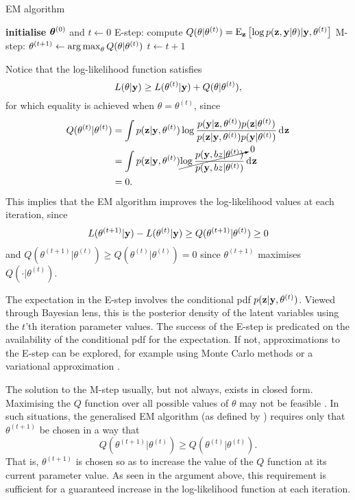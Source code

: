 \begin{algorithm}[H]
\caption{EM algorithm}\label{alg:EM4}
\begin{algorithmic}[1]
  \State \textbf{initialise} ${\bm\theta}^{(0)}$ and $t\gets 0$
    \State E-step: compute $Q(\theta|\theta^{(t)}) = \operatorname{E}_{\mathbf z} \left[\log p({\mathbf z},{\mathbf y}|\theta) | {\mathbf y}, \theta^{(t)} \right]$
    \State M-step: $\theta^{(t+1)} \gets \operatorname*{arg\,max}_\theta Q(\theta|\theta^{(t)})$
    \State $t \gets t + 1$
  \EndWhile
\end{algorithmic}
\end{algorithm}

Notice that the log-likelihood function satisfies
\begin{equation}
  L(\theta|{\mathbf y}) \geq L(\theta^{(t)}|{\mathbf y}) + Q(\theta|\theta^{(t)}),
\end{equation}
for which equality is achieved when $\theta = \theta^{(t)}$, since
\begin{align*}
  Q(\theta^{(t)}|\theta^{(t)})
  &= \int p({\mathbf z}|{\mathbf y},\theta^{(t)}) \log \frac{p({\mathbf y}|{\mathbf z},\theta^{(t)})p({\mathbf z}|\theta^{(t)})}{p({\mathbf z}|{\mathbf y},\theta^{(t)})p({\mathbf y}|\theta^{(t)})} \operatorname{d}\hspace{0.5pt}\!{\mathbf z} \\
  &= \int p({\mathbf z}|{\mathbf y},\theta^{(t)}) \cancelto{0}{\log \frac{p({\mathbf y},bz|\theta^{(t)})}{p({\mathbf y},bz|\theta^{(t)})}} \operatorname{d}\hspace{0.5pt}\!{\mathbf z}\\
  &=0.
\end{align*}
This implies that the EM algorithm improves the log-likelihood values at each iteration, since
\begin{align*}
  L(\theta^{(t+1)}|{\mathbf y}) - L(\theta^{(t)}|{\mathbf y}) \geq  Q(\theta^{(t+1)}|\theta^{(t)}) \geq 0
\end{align*}
and $Q(\theta^{(t+1)}|\theta^{(t)}) \geq Q(\theta^{(t)}|\theta^{(t)}) = 0$ since $\theta^{(t+1)}$ maximises $Q(\cdot|\theta^{(t)})$.

The expectation in the E-step involves the conditional pdf $p({\mathbf z}|{\mathbf y},\theta^{(t)})$.
Viewed through Bayesian lens, this is the posterior density of the latent variables using the $t$'th iteration parameter values.
The success of the E-step is predicated on the availability of the conditional pdf for the expectation.
If not, approximations to the E-step can be explored, for example using Monte Carlo methods \citep{wei1990monte} or a variational approximation \citep{beal2003variational}.

The solution to the M-step usually, but not always, exists in closed form.
Maximising the $Q$ function over all possible values of $\theta$ may not be feasible \citep{mclachlan2007algorithm}.
In such situations, the generalised EM algorithm (as defined by \cite{dempster1977maximum}) requires only that $\theta^{(t+1)}$ be chosen in a way that
\[
  Q(\theta^{(t+1)}|\theta^{(t)}) \geq Q(\theta^{(t)}|\theta^{(t)}).
\]
That is, $\theta^{(t+1)}$ is chosen so as to increase the value of the $Q$ function at its current parameter value.
As seen in the argument above, this requirement is sufficient for a guaranteed increase in the log-likelihood function at each iteration.

